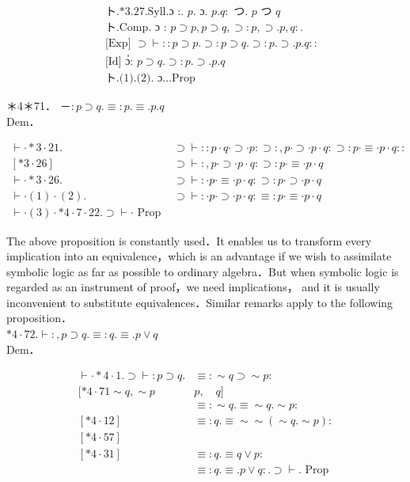 \documentclass[10pt]{article}
\begin{document}
\begin{align*}
& \text { ト.*3.27.Syll.ɔ :. } p . \text { ɔ. } p . q: \text { つ. } p \text { つ } q  \tag{1}\\
& \text { ト.Comp. ɔ : } p \supset p, p \supset q, \supset: p, \supset . p, q: . \\
& \text { [Exp] } \supset \vdash:: p \supset p . \supset: p \supset q . \supset: p . \supset . p . q:: \\
& \text { [Id] ɔํ: } p \supset q . \supset: p . \supset . p . q  \tag{2}\\
& \text { ト.(1).(2). ɔ…Prop }
\end{align*}


＊4＊71． －$: p \supset q . \equiv: p . \equiv . p . q$\\
Dem．

\[
\begin{array}{ll}
\vdash \cdot * 3 \cdot 21 . & \supset \vdash:: p \cdot q \cdot \supset \cdot p: \supset:, p \cdot \supset \cdot p \cdot q: \supset: p \cdot \equiv \cdot p \cdot q:: \\
{[* 3 \cdot 26]} & \supset \vdash:, p \cdot \supset \cdot p \cdot q: \supset: p \cdot \equiv \cdot p \cdot q \\
\vdash \cdot * 3 \cdot 26 . & \supset \vdash: \cdot p \cdot \equiv \cdot p \cdot q: \supset: p \cdot \supset \cdot p \cdot q \\
\vdash \cdot(1) \cdot(2) . & \supset \vdash: \cdot p \cdot \supset \cdot p \cdot q: \equiv: p \cdot \equiv \cdot p \cdot q  \tag{3}\\
\vdash \cdot(3) \cdot * 4 \cdot 7 \cdot 22 . \supset \vdash \cdot \text { Prop }
\end{array}
\]

The above proposition is constantly used．It enables us to transform every implication into an equivalence，which is an advantage if we wish to assimilate symbolic logic as far as possible to ordinary algebra．But when symbolic logic is regarded as an instrument of proof，we need implications， and it is usually inconvenient to substitute equivalences．Similar remarks apply to the following proposition．\\
$* 4 \cdot 72 . \vdash:, p \supset q . \equiv: q . \equiv . p \vee q$\\
Dem．

$$
\begin{array}{ll}
\vdash \cdot * 4 \cdot 1 . \supset \vdash: p \supset q . & \equiv: \sim q \supset \sim p: \\
{[* 4 \cdot 71 \sim q, \sim p} & p, \quad q] \\
& \equiv: \sim q . \equiv \sim q . \sim p: \\
{[* 4 \cdot 12]} & \equiv: q . \equiv \sim \sim(\sim q . \sim p): \\
{[* 4 \cdot 57]} & \\
{[* 4 \cdot 31]} & \equiv: q . \equiv q \vee p: \\
& \equiv: q . \equiv . p \vee q: . \supset \vdash . \text { Prop }
\end{array}
$$
\end{document}
